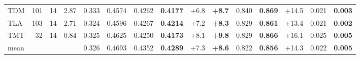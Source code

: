 \begin{tabular}{lrrrc ccc cc cc c cc}
TDM & 101 & 14 & 2.87 & 0.333 & 0.4574 & 0.4262 & \textbf{0.4177} & +6.8 & \textbf{+8.7} & 0.840 & \textbf{0.869} & +14.5 & 0.021 & \textbf{0.003} \\
TLA & 103 & 14 & 2.71 & 0.324 & 0.4596 & 0.4267 & \textbf{0.4214} & +7.2 & \textbf{+8.3} & 0.829 & \textbf{0.861} & +13.4 & 0.021 & \textbf{0.002} \\
TMT & 32 & 14 & 0.84 & 0.325 & 0.4625 & 0.4250 & \textbf{0.4173} & +8.1 & \textbf{+9.8} & 0.829 & \textbf{0.866} & +16.1 & 0.025 & \textbf{0.005} \\
\midrule
mean & & & & 0.326 & 0.4693 & 0.4352 & \textbf{0.4289} & +7.3 & \textbf{+8.6} & 0.822 & \textbf{0.856} & +14.3 & 0.022 & \textbf{0.005} \\
\bottomrule
\end{tabular}
